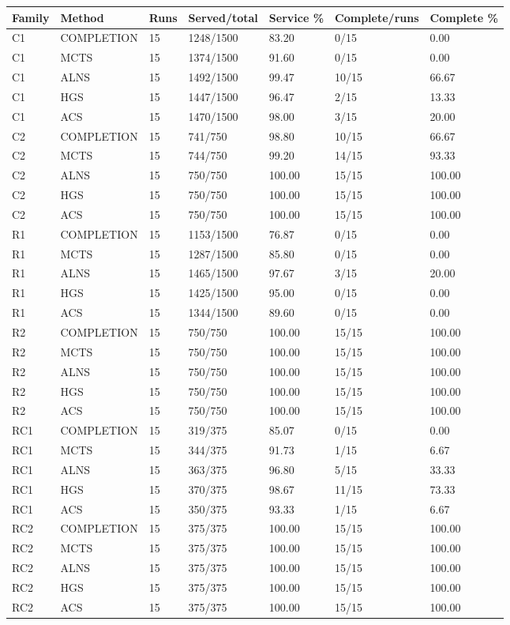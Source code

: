 \begin{tabular}{lllllll}
\hline
Family & Method & Runs & Served/total & Service \% & Complete/runs & Complete \% \\
\hline
C1 & COMPLETION & 15 & 1248/1500 & 83.20 & 0/15 & 0.00 \\
C1 & MCTS & 15 & 1374/1500 & 91.60 & 0/15 & 0.00 \\
C1 & ALNS & 15 & 1492/1500 & 99.47 & 10/15 & 66.67 \\
C1 & HGS & 15 & 1447/1500 & 96.47 & 2/15 & 13.33 \\
C1 & ACS & 15 & 1470/1500 & 98.00 & 3/15 & 20.00 \\
C2 & COMPLETION & 15 & 741/750 & 98.80 & 10/15 & 66.67 \\
C2 & MCTS & 15 & 744/750 & 99.20 & 14/15 & 93.33 \\
C2 & ALNS & 15 & 750/750 & 100.00 & 15/15 & 100.00 \\
C2 & HGS & 15 & 750/750 & 100.00 & 15/15 & 100.00 \\
C2 & ACS & 15 & 750/750 & 100.00 & 15/15 & 100.00 \\
R1 & COMPLETION & 15 & 1153/1500 & 76.87 & 0/15 & 0.00 \\
R1 & MCTS & 15 & 1287/1500 & 85.80 & 0/15 & 0.00 \\
R1 & ALNS & 15 & 1465/1500 & 97.67 & 3/15 & 20.00 \\
R1 & HGS & 15 & 1425/1500 & 95.00 & 0/15 & 0.00 \\
R1 & ACS & 15 & 1344/1500 & 89.60 & 0/15 & 0.00 \\
R2 & COMPLETION & 15 & 750/750 & 100.00 & 15/15 & 100.00 \\
R2 & MCTS & 15 & 750/750 & 100.00 & 15/15 & 100.00 \\
R2 & ALNS & 15 & 750/750 & 100.00 & 15/15 & 100.00 \\
R2 & HGS & 15 & 750/750 & 100.00 & 15/15 & 100.00 \\
R2 & ACS & 15 & 750/750 & 100.00 & 15/15 & 100.00 \\
RC1 & COMPLETION & 15 & 319/375 & 85.07 & 0/15 & 0.00 \\
RC1 & MCTS & 15 & 344/375 & 91.73 & 1/15 & 6.67 \\
RC1 & ALNS & 15 & 363/375 & 96.80 & 5/15 & 33.33 \\
RC1 & HGS & 15 & 370/375 & 98.67 & 11/15 & 73.33 \\
RC1 & ACS & 15 & 350/375 & 93.33 & 1/15 & 6.67 \\
RC2 & COMPLETION & 15 & 375/375 & 100.00 & 15/15 & 100.00 \\
RC2 & MCTS & 15 & 375/375 & 100.00 & 15/15 & 100.00 \\
RC2 & ALNS & 15 & 375/375 & 100.00 & 15/15 & 100.00 \\
RC2 & HGS & 15 & 375/375 & 100.00 & 15/15 & 100.00 \\
RC2 & ACS & 15 & 375/375 & 100.00 & 15/15 & 100.00 \\
\hline
\end{tabular}
